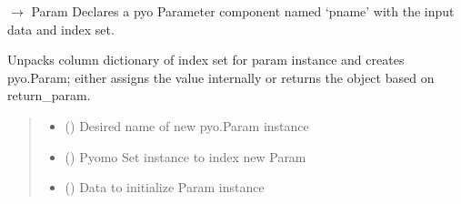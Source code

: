 \documentclass[letterpaper,10pt,english]{sphinxmanual}
\begin{document}
\begin{fulllineitems}
\begin{fulllineitems}
\label{\detokenize{src.common.model:src.common.model.Model.declare_param}}
\pysigstartsignatures
\pysiglinewithargsret
{}
{\sphinxparamcomma {}\sphinxparamcomma {}\sphinxparamcomma {}\sphinxparamcomma {}\sphinxparamcomma {}}
{{ $\rightarrow$ Param}}
\pysigstopsignatures
\sphinxAtStartPar
Declares a pyo Parameter component named ‘pname’ with the input data and index set.

\sphinxAtStartPar
Unpacks column dictionary of index set for param instance and creates pyo.Param; either
assigns the value internally or returns the object based on return\_param.
\begin{quote}\begin{description}
\begin{itemize}
\item {} 
\sphinxAtStartPar
{} () \textendash{} Desired name of new pyo.Param instance

\item {} 
\sphinxAtStartPar
{} () \textendash{} Pyomo Set instance to index new Param

\item {} 
\sphinxAtStartPar
{} (\sphinxstyleliteralemphasis{\sphinxupquote{ | }}\sphinxstyleliteralemphasis{\sphinxupquote{ | }}) \textendash{} Data to initialize Param instance


\end{itemize}
\end{description}
\end{quote}
\end{fulllineitems}
\end{fulllineitems}
\end{document}
